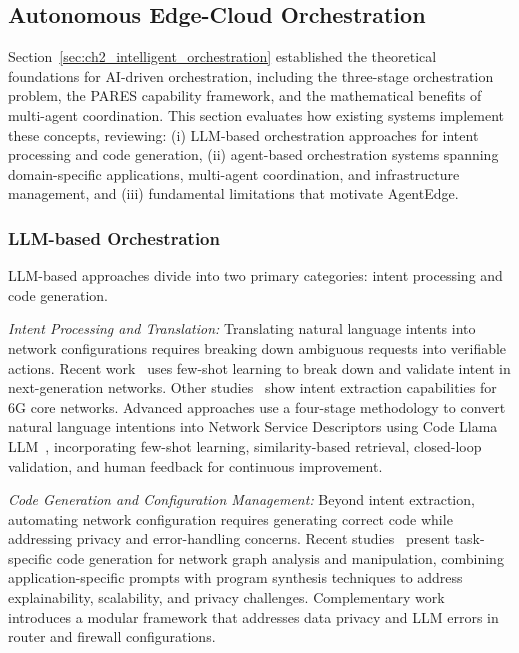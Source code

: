 \subsection{Autonomous Edge-Cloud Orchestration}
\label{sec:ch2_sota_agent}

Section~\ref{sec:ch2_intelligent_orchestration} established the theoretical foundations for \ac{AI}-driven orchestration, including the three-stage orchestration problem, the \ac{PARES} capability framework, and the mathematical benefits of multi-agent coordination. This section evaluates how existing systems implement these concepts, reviewing: (i) \ac{LLM}-based orchestration approaches for intent processing and code generation, (ii) agent-based orchestration systems spanning domain-specific applications, multi-agent coordination, and infrastructure management, and (iii) fundamental limitations that motivate \ac{AgentEdge}.

\subsubsection{LLM-based Orchestration}

\ac{LLM}-based approaches divide into two primary categories: intent processing and code generation.

\textit{Intent Processing and Translation:} Translating natural language intents into network configurations requires breaking down ambiguous requests into verifiable actions. Recent work~\cite{intent_driven_ran2021} uses few-shot learning to break down and validate intent in next-generation networks. Other studies~\cite{IntentBasedNetworkManagementDRCN2024} show intent extraction capabilities for \ac{6G} core networks. Advanced approaches use a four-stage methodology to convert natural language intentions into Network Service Descriptors using Code Llama \ac{LLM}~\cite{LLMIntentServiceConfig2024}, incorporating few-shot learning, similarity-based retrieval, closed-loop validation, and human feedback for continuous improvement.

\textit{Code Generation and Configuration Management:} Beyond intent extraction, automating network configuration requires generating correct code while addressing privacy and error-handling concerns. Recent studies~\cite{EnhancingNetworkManagementMSR2023} present task-specific code generation for network graph analysis and manipulation, combining application-specific prompts with program synthesis techniques to address explainability, scalability, and privacy challenges. Complementary work~\cite{IntentNetworksLLMFramework2024} introduces a modular framework that addresses data privacy and \ac{LLM} errors in router and firewall configurations.

